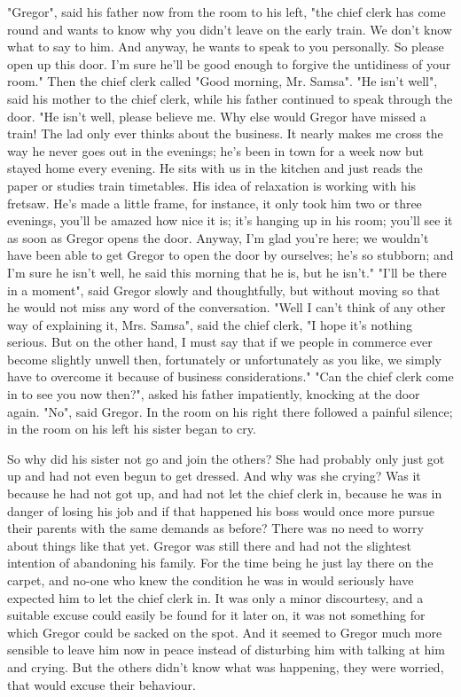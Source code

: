 \documentclass[12pt]{book}
\begin{document}
    "Gregor", said his father now from the room to his left, "the chief clerk has come round and wants to know why you didn't leave on the early train. We don't know what to say to him. And anyway, he wants to speak to you personally. So please open up this door. I'm sure he'll be good enough to forgive the untidiness of your room." Then the chief clerk called "Good morning, Mr. Samsa". "He isn't well", said his mother to the chief clerk, while his father continued to speak through the door. "He isn't well, please believe me. Why else would Gregor have missed a train! The lad only ever thinks about the business. It nearly makes me cross the way he never goes out in the evenings; he's been in town for a week now but stayed home every evening. He sits with us in the kitchen and just reads the paper or studies train timetables. His idea of relaxation is working with his fretsaw. He's made a little frame, for instance, it only took him two or three evenings, you'll be amazed how nice it is; it's hanging up in his room; you'll see it as soon as Gregor opens the door. Anyway, I'm glad you're here; we wouldn't have been able to get Gregor to open the door by ourselves; he's so stubborn; and I'm sure he isn't well, he said this morning that he is, but he isn't." "I'll be there in a moment", said Gregor slowly and thoughtfully, but without moving so that he would not miss any word of the conversation. "Well I can't think of any other way of explaining it, Mrs. Samsa", said the chief clerk, "I hope it's nothing serious. But on the other hand, I must say that if we people in commerce ever become slightly unwell then, fortunately or unfortunately as you like, we simply have to overcome it because of business considerations." "Can the chief clerk come in to see you now then?", asked his father impatiently, knocking at the door again. "No", said Gregor. In the room on his right there followed a painful silence; in the room on his left his sister began to cry.

    So why did his sister not go and join the others? She had probably only just got up and had not even begun to get dressed. And why was she crying? Was it because he had not got up, and had not let the chief clerk in, because he was in danger of losing his job and if that happened his boss would once more pursue their parents with the same demands as before? There was no need to worry about things like that yet. Gregor was still there and had not the slightest intention of abandoning his family. For the time being he just lay there on the carpet, and no-one who knew the condition he was in would seriously have expected him to let the chief clerk in. It was only a minor discourtesy, and a suitable excuse could easily be found for it later on, it was not something for which Gregor could be sacked on the spot. And it seemed to Gregor much more sensible to leave him now in peace instead of disturbing him with talking at him and crying. But the others didn't know what was happening, they were worried, that would excuse their behaviour.
\end{document}
